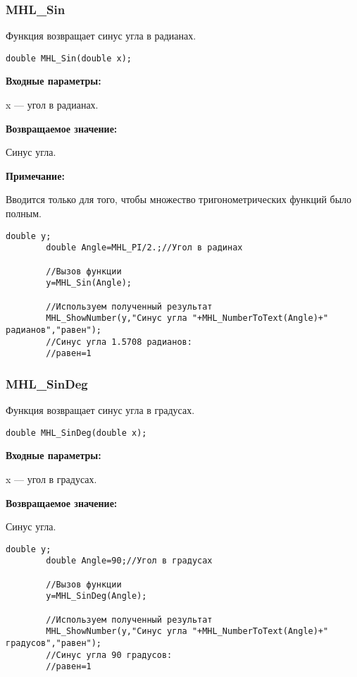 \documentclass[a4paper,12pt]{article}
\begin{document}
\subsubsection{MHL\_Sin}\label{MHL_Sin}

Функция возвращает синус угла в радианах.


\begin{lstlisting}[label=code_syntax_MHL_Sin,caption=Синтаксис]
double MHL_Sin(double x);
\end{lstlisting}

\textbf{Входные параметры:}

 x --- угол в радианах.

\textbf{Возвращаемое значение:}

Синус угла.

\textbf{Примечание:}

 Вводится только для того, чтобы множество тригонометрических функций было полным.


\begin{lstlisting}[label=code_use_MHL_Sin,caption=Пример использования]
        double y;
        double Angle=MHL_PI/2.;//Угол в радинах

        //Вызов функции
        y=MHL_Sin(Angle);

        //Используем полученный результат
        MHL_ShowNumber(y,"Синус угла "+MHL_NumberToText(Angle)+" радианов","равен");
        //Синус угла 1.5708 радианов:
        //равен=1
\end{lstlisting}

\subsubsection{MHL\_SinDeg}\label{MHL_SinDeg}

Функция возвращает синус угла в градусах.


\begin{lstlisting}[label=code_syntax_MHL_SinDeg,caption=Синтаксис]
double MHL_SinDeg(double x);
\end{lstlisting}

\textbf{Входные параметры:}

 x --- угол в градусах.

\textbf{Возвращаемое значение:}

Синус угла.


\begin{lstlisting}[label=code_use_MHL_SinDeg,caption=Пример использования]
        double y;
        double Angle=90;//Угол в градусах

        //Вызов функции
        y=MHL_SinDeg(Angle);

        //Используем полученный результат
        MHL_ShowNumber(y,"Синус угла "+MHL_NumberToText(Angle)+" градусов","равен");
        //Синус угла 90 градусов:
        //равен=1
\end{lstlisting}
\end{document}
